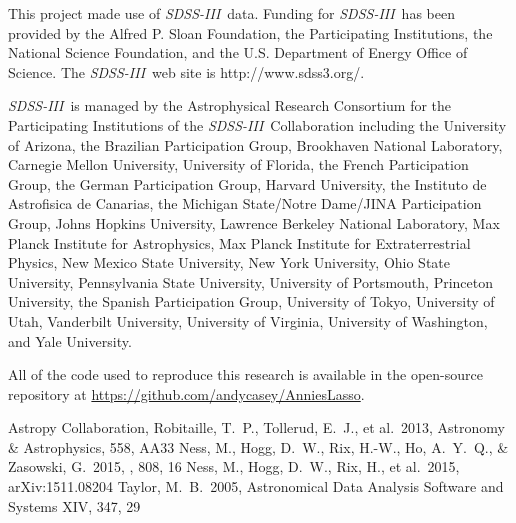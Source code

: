 \documentclass[12pt,preprint]{aastex}
\newcommand{\project}[1]{\textsl{#1}}
\newcommand{\acronym}[1]{{\small{#1}}}
\newcommand{\sdssiii}{\project{\acronym{SDSS-III}}}
\begin{document}

This project made use of \sdssiii\ data.
Funding for \sdssiii\ has been provided by the Alfred P. Sloan
Foundation, the Participating Institutions, the National Science
Foundation, and the \acronym{U.S.} Department of Energy Office of Science. The
\sdssiii\ web site is http://www.sdss3.org/.

\sdssiii\ is managed by the Astrophysical Research Consortium for the
Participating Institutions of the \sdssiii\ Collaboration including the
University of Arizona, the Brazilian Participation Group, Brookhaven
National Laboratory, Carnegie Mellon University, University of
Florida, the French Participation Group, the German Participation
Group, Harvard University, the Instituto de Astrofisica de Canarias,
the Michigan State/Notre Dame/\acronym{JINA} Participation Group, Johns Hopkins
University, Lawrence Berkeley National Laboratory, Max Planck
Institute for Astrophysics, Max Planck Institute for Extraterrestrial
Physics, New Mexico State University, New York University, Ohio State
University, Pennsylvania State University, University of Portsmouth,
Princeton University, the Spanish Participation Group, University of
Tokyo, University of Utah, Vanderbilt University, University of
Virginia, University of Washington, and Yale University.

All of the code used to reproduce this research is available in the open-source
repository at \url{https://github.com/andycasey/AnniesLasso}.



\begin{thebibliography}{dummy}\raggedright
{} Astropy Collaboration, Robitaille, T.~P., Tollerud, E.~J., et al.\ 2013, Astronomy \& Astrophysics, 558, AA33 
 Ness, M., Hogg, D.~W., 
Rix, H.-W., Ho, A.~Y.~Q., \& Zasowski, G.\ 2015, \apj, 808, 16
 Ness, M., Hogg, D.~W., 
Rix, H., et al.\ 2015, arXiv:1511.08204 
 Taylor, M.~B.\ 2005, Astronomical Data Analysis Software and Systems XIV, 347, 29 
\end{thebibliography}

\clearpage
\end{document}
